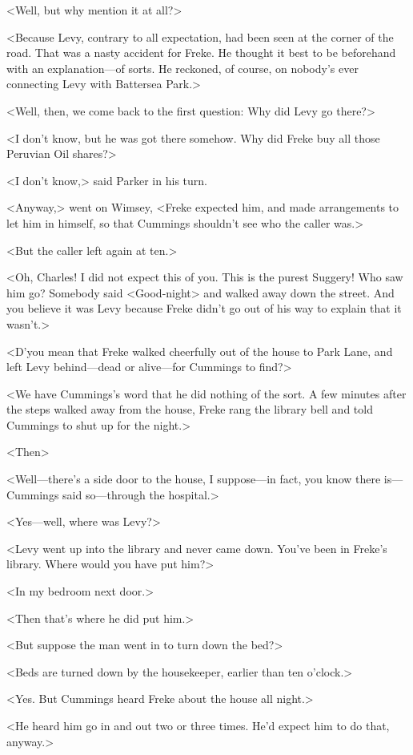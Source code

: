 <Well, but why mention it at all?>

<Because Levy, contrary to all expectation, had been seen at the corner of the road. That was a nasty accident for Freke. He thought it best to be beforehand with an explanation—of sorts. He reckoned, of course, on nobody's ever connecting Levy with Battersea Park.>

<Well, then, we come back to the first question: Why did Levy go there?>

<I don't know, but he was got there somehow. Why did Freke buy all those Peruvian Oil shares?>

<I don't know,> said Parker in his turn.

<Anyway,> went on Wimsey, <Freke expected him, and made arrangements to let him in himself, so that Cummings shouldn't see who the caller was.>

<But the caller left again at ten.>

<Oh, Charles! I did not expect this of you. This is the purest Suggery! Who saw him go? Somebody said <Good-night> and walked away down the street. And you believe it was Levy because Freke didn't go out of his way to explain that it wasn't.>

<D'you mean that Freke walked cheerfully out of the house to Park Lane, and left Levy behind—dead or alive—for Cummings to find?>

<We have Cummings's word that he did nothing of the sort. A few minutes after the steps walked away from the house, Freke rang the library bell and told Cummings to shut up for the night.>

<Then\longdash>

<Well—there's a side door to the house, I suppose—in fact, you know there is—Cummings said so—through the hospital.>

<Yes—well, where was Levy?>

<Levy went up into the library and never came down. You've been in Freke's library. Where would you have put him?>

<In my bedroom next door.>

<Then that's where he did put him.>

<But suppose the man went in to turn down the bed?>

<Beds are turned down by the housekeeper, earlier than ten o'clock.>

<Yes\textellipsis . But Cummings heard Freke about the house all night.>

<He heard him go in and out two or three times. He'd expect him to do that, anyway.>

